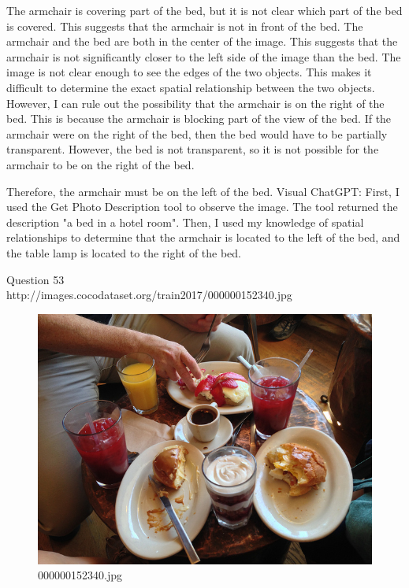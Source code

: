 \begin{enumerate}
    The armchair is covering part of the bed, but it is not clear which part of the bed is covered. This suggests that the armchair is not in front of the bed.
    The armchair and the bed are both in the center of the image. This suggests that the armchair is not significantly closer to the left side of the image than the bed.
    The image is not clear enough to see the edges of the two objects. This makes it difficult to determine the exact spatial relationship between the two objects.
    However, I can rule out the possibility that the armchair is on the right of the bed. This is because the armchair is blocking part of the view of the bed. If the armchair were on the right of the bed, then the bed would have to be partially transparent. However, the bed is not transparent, so it is not possible for the armchair to be on the right of the bed.

    Therefore, the armchair must be on the left of the bed.
    \subitem Visual ChatGPT: First, I used the Get Photo Description tool to observe the image. The tool returned the description "a bed in a hotel room". Then, I used my knowledge of spatial relationships to determine that the armchair is located to the left of the bed, and the table lamp is located to the right of the bed.
\end{enumerate}
Question 53\\
http://images.cocodataset.org/train2017/000000152340.jpg
\begin{figure}[h]
    \centering
    \includegraphics[width=0.8\linewidth]{../image set/hard/000000152340.jpg}
    \caption{000000152340.jpg}
\end{figure}
